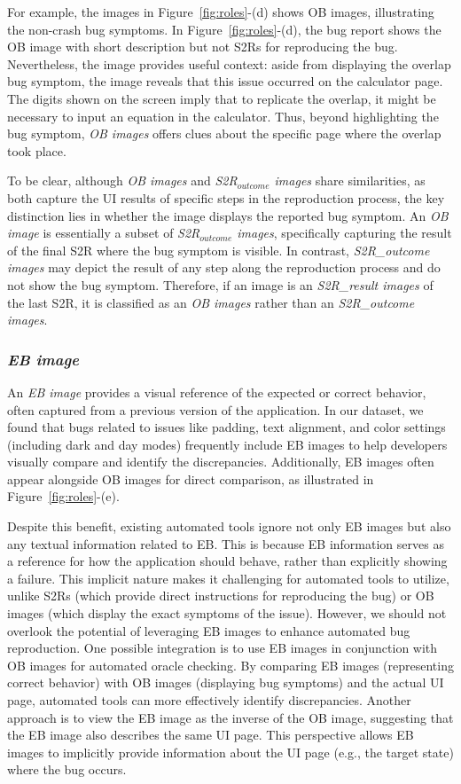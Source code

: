 For example, the images in Figure~\ref{fig:roles}-(d) shows OB images, illustrating the non-crash bug symptoms. 
%
In  Figure~\ref{fig:roles}-(d), the bug report shows the OB image with short description but not   S2Rs for reproducing the bug. Nevertheless, the image provides useful context: aside from displaying the overlap bug symptom, the image reveals that this issue occurred on the calculator page. The digits shown on the screen imply that to replicate the overlap, it might be necessary to input an equation in the calculator. Thus, beyond highlighting the bug symptom, \textit{OB images} offers clues about the specific page where the overlap took place.


To be clear, although \textit{OB images} and \textit{S2R$_{outcome}$ images} share similarities, as both capture the UI results of specific steps in the reproduction process, the key distinction lies in whether the image displays the reported bug symptom. An \textit{OB image} is essentially a subset of \textit{S2R$_{outcome}$ images}, specifically capturing the result of the final S2R where the bug symptom is visible. In contrast, \textit{S2R\_outcome images} may depict the result of any step along the reproduction process and do not show the bug symptom. Therefore, if an image is an \textit{S2R\_result images} of the last S2R, it is classified as an \textit{OB images} rather than an \textit{S2R\_outcome images}.


\subsubsection{
\textbf{\textit{EB image}}} 
An \textit{EB image}  provides a visual reference of the expected or correct behavior,  often captured from a previous version of the application. In our dataset, we found that bugs related to issues like padding, text alignment, and color settings (including dark and day modes) frequently include EB images to help developers visually compare and identify the discrepancies. Additionally, EB images often appear alongside OB images for direct comparison, as illustrated in Figure~\ref{fig:roles}-(e).

Despite this benefit, existing automated tools ignore not only EB images but also any textual information related to EB. This is because EB information serves as a reference for how the application should behave, rather than explicitly showing a failure. This implicit nature makes it challenging for automated tools to utilize, unlike S2Rs (which provide direct instructions for reproducing the bug) or OB images (which display the exact symptoms of the issue). 
%
However, we should not overlook the potential of leveraging EB images to enhance automated bug reproduction. One possible integration is to use EB images in conjunction with OB images for automated oracle checking. By comparing EB images (representing correct behavior) with OB images (displaying bug symptoms) and the actual UI page, automated tools can more effectively identify discrepancies. Another approach is to view the EB image as the inverse of the OB image, suggesting that the EB image also describes the same UI page. This perspective allows EB images to implicitly provide information about the UI page (e.g., the target state) where the bug occurs. 

